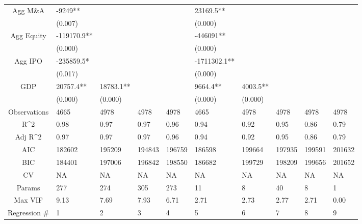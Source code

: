 \documentclass{article}
\begin{document}
\begin{table}[H]
\begin{tabular}{|clllllllll|}
  Agg M\&A & -9249** &  &  &  & 23169.5** &  &  &  &  \\ 
   & (0.007) &  &  &  & (0.000) &  &  &  &  \\ 
  Agg Equity & -119170.9** &  &  &  & -446091** &  &  &  &  \\ 
   & (0.000) &  &  &  & (0.000) &  &  &  &  \\ 
  Agg IPO & -235859.5* &  &  &  & -1711302.1** &  &  &  &  \\ 
   & (0.017) &  &  &  & (0.000) &  &  &  &  \\ 
  GDP & 20757.4** & 18783.1** &  &  & 9664.4** & 4003.5** &  &  &  \\ 
   & (0.000) & (0.000) &  &  & (0.000) & (0.000) &  &  &  \\ 
  \hline 
 Observations & 4665 & 4978 & 4978 & 4978 & 4665 & 4978 & 4978 & 4978 & 4978 \\ 
  R^2 & 0.98 & 0.97 & 0.97 & 0.96 & 0.94 & 0.92 & 0.95 & 0.86 & 0.79 \\ 
  Adj R^2 & 0.97 & 0.97 & 0.97 & 0.96 & 0.94 & 0.92 & 0.95 & 0.86 & 0.79 \\ 
  AIC & 182602 & 195209 & 194843 & 196759 & 186598 & 199664 & 197935 & 199591 & 201632 \\ 
  BIC & 184401 & 197006 & 196842 & 198550 & 186682 & 199729 & 198209 & 199656 & 201652 \\ 
  CV & NA & NA & NA & NA & NA & NA & NA & NA & NA \\ 
  Params & 277 & 274 & 305 & 273 & 11 & 8 & 40 & 8 & 1 \\ 
  Max VIF & 9.13 & 7.69 & 7.93 & 6.71 & 2.71 & 2.73 & 2.77 & 2.71 & 0.00 \\ 
  Regression \# & 1 & 2 & 3 & 4 & 5 & 6 & 7 & 8 & 9 \\ 
   \hline
\end{tabular}
 
\end{table}
\end{document}
